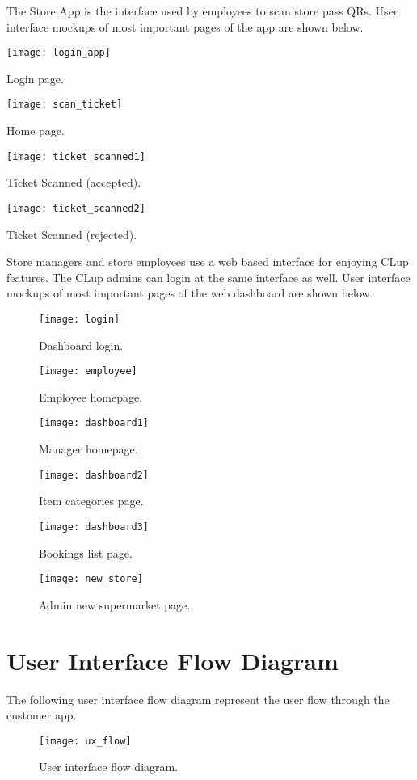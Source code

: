 \clearpage
The Store App is the interface used by employees to scan store pass QRs.
User interface mockups of most important pages of the app are shown below.
\vspace{0.5cm}

\begin{minipage}{.5\textwidth}
	\centering
	\texttt{[image: login\_app]}
	\captionsetup{type=figure}
	\caption{Login page.}
\end{minipage}%
\begin{minipage}{.5\textwidth}
	\centering
	\texttt{[image: scan\_ticket]}
	\captionsetup{type=figure}
	\caption{Home page.}
\end{minipage}

\vspace{1cm}

\begin{minipage}{.5\textwidth}
	\centering
	\texttt{[image: ticket\_scanned1]}
	\captionsetup{type=figure}
	\caption{Ticket Scanned (accepted).}
\end{minipage}%
\begin{minipage}{.5\textwidth}
	\centering
	\texttt{[image: ticket\_scanned2]}
	\captionsetup{type=figure}
	\caption{Ticket Scanned (rejected).}
\end{minipage}

\clearpage

Store managers and store employees use a web based interface for enjoying CLup features. The CLup admins can login at the same interface as well.
User interface mockups of most important pages of the web dashboard are shown below.
\vspace{0.5cm}
\begin{figure}[H]
	\centering
	\texttt{[image: login]}
	\caption{Dashboard login.}
\end{figure}
\begin{figure}[H]
	\centering
	\texttt{[image: employee]}
	\caption{Employee homepage.}
\end{figure}
\begin{figure}[H]
	\centering
	\texttt{[image: dashboard1]}
	\caption{Manager homepage.}
\end{figure}
\begin{figure}[H]
	\centering
	\texttt{[image: dashboard2]}
	\caption{Item categories page.}
\end{figure}
\begin{figure}[H]
	\centering
	\texttt{[image: dashboard3]}
	\caption{Bookings list page.}
\end{figure}
\begin{figure}[H]
	\centering
	\texttt{[image: new\_store]}
	\caption{Admin new supermarket page.}
\end{figure}

\clearpage

\section{User Interface Flow Diagram}
The following user interface flow diagram represent the user flow through the customer app.
\begin{figure}[H]
	\centering
	\texttt{[image: ux\_flow]}
	\caption{User interface flow diagram.}
\end{figure}